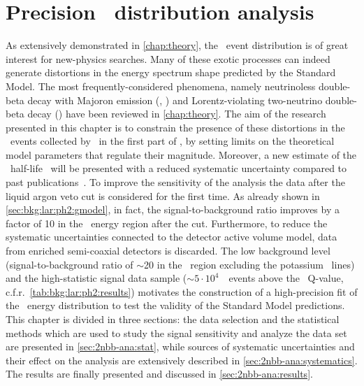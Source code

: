 
\chapter{\texorpdfstring{Precision \nnbb\ distribution analysis}{Precision 2νββ distribution analysis}}%
\label{chap:2nbb-ana}

As extensively demonstrated in \cref{chap:theory}, the \nnbb\ event distribution is of
great interest for new-physics searches. Many of these exotic processes can indeed
generate distortions in the energy spectrum shape predicted by the Standard Model. The
most frequently-considered phenomena, namely neutrinoless double-beta decay with Majoron
emission (\onbbx, \onbbxx) and Lorentz-violating two-neutrino double-beta decay (\nnbblv)
have been reviewed in \cref{chap:theory}. The aim of the research presented in this
chapter is to constrain the presence of these distortions in the \nnbb\ events collected
by \gerda\ in the first part of \phasetwo, by setting limits on the theoretical model
parameters that regulate their magnitude. Moreover, a new estimate of the \nnbb\ half-life
\thalftwo\ will be presented with a reduced systematic uncertainty compared to past
publications~\cite{Agostini2015a}. To improve the sensitivity of the analysis the data
after the liquid argon veto cut is considered for the first time. As already shown in
\cref{sec:bkg:lar:ph2:gmodel}, in fact, the signal-to-background ratio improves by a factor of 10
in the \nnbb\ energy region after the cut. Furthermore, to reduce the systematic
uncertainties connected to the detector active volume model, data from enriched
semi-coaxial detectors is discarded. The low background level (signal-to-background ratio
of $\sim$20 in the \nnbb\ region excluding the potassium \g\ lines) and the high-statistic
signal data sample ($\sim$$5 \cdot 10^{4}$~\nnbb\ events above the \Arl\ Q-value,
c.f.r.~\cref{tab:bkg:lar:ph2:results}) motivates the construction of a high-precision fit
of the \nnbb\ energy distribution to test the validity of the Standard Model predictions.
\newpar
This chapter is divided in three sections: the data selection and the statistical methods
which are used to study the signal sensitivity and analyze the data set are presented in
\cref{sec:2nbb-ana:stat}, while sources of systematic uncertainties and their effect on
the analysis are extensively described in \cref{sec:2nbb-ana:systematics}. The
results are finally presented and discussed in \cref{sec:2nbb-ana:results}.

